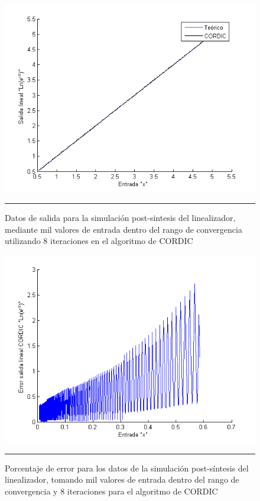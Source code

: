 \begin{figure}[H]
  \centering
    \includegraphics[scale=0.8]{./RANGO_8iter.png}
    \rule{35em}{0.5pt}
  \caption[Datos de salida para la simulación post-sintesis del linealizador, mediante mil valores de entrada dentro del rango de convergencia utilizando 8 iteraciones en el algoritmo de CORDIC]{Datos de salida para la simulación post-sintesis del linealizador, mediante mil valores de entrada dentro del rango de convergencia utilizando 8 iteraciones en el algoritmo de CORDIC }
  \label{fig:RG8}
\end{figure}

\newpage

\begin{figure}[H]
  \centering
    \includegraphics[scale=0.8]{./RANGO_8iter_ERROR.png}
    \rule{35em}{0.5pt}
  \caption[Porcentaje de error para los datos de la simulación post-síntesis del linealizador, tomando mil valores de entrada dentro del rango de convergencia y  8 iteraciones para el algoritmo de CORDIC]{Porcentaje de error para los datos de la simulación post-síntesis del linealizador, tomando mil valores de entrada dentro del rango de convergencia y  8 iteraciones para el algoritmo de CORDIC}
  \label{fig:RGE8}
\end{figure}


